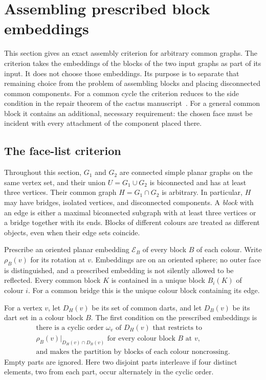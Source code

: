 \section{Assembling prescribed block embeddings}
\label{rep:section}

This section gives an exact assembly criterion for arbitrary common graphs.
The criterion takes the embeddings of the blocks of the two input graphs as
part of its input.  It does not choose those embeddings.  Its purpose is to
separate that remaining choice from the problem of assembling blocks and
placing disconnected common components.  For a common cycle the criterion
reduces to the side condition in the repair theorem of the cactus
manuscript~\cite{cactus}.  For a general common block it contains an additional,
necessary requirement: the chosen face must be incident with every attachment
of the component placed there.

\subsection{The face-list criterion}
\label{rep:criterion}

Throughout this section, $G_1$ and $G_2$ are connected simple planar graphs on
the same vertex set, and their union $U=G_1\cup G_2$ is biconnected and has at
least three vertices.  Their common graph $H=G_1\cap G_2$ is arbitrary.  In
particular, $H$ may have bridges, isolated vertices, and disconnected
components.  A \emph{block} with an edge is either a maximal biconnected
subgraph with at least three vertices or a bridge together with its ends.
Blocks of different colours are treated as different objects, even when their
edge sets coincide.

Prescribe an oriented planar embedding $\mathcal E_B$ of every block $B$ of
each colour.  Write $\rho_B(v)$ for its rotation at $v$.  Embeddings are on an
oriented sphere; no outer face is distinguished, and a prescribed embedding
is not silently allowed to be reflected.  Every common block $K$ is contained
in a unique block $B_i(K)$ of colour $i$.  For a common bridge this is the
unique colour block containing its edge.

For a vertex $v$, let $D_H(v)$ be its set of common darts, and let $D_B(v)$
be its dart set in a colour block $B$.  The first condition
on the prescribed embeddings is
\begin{equation}
\tag{O}\label{rep:eq:order}
\begin{gathered}
\text{there is a cyclic order $\omega_v$ of $D_H(v)$ that restricts to}
\\[-1mm]
\rho_B(v)|_{D_H(v)\cap D_B(v)}\text{ for every colour block $B$ at $v$,}
\\[-1mm]
\text{and makes the partition by blocks of each colour noncrossing.}
\end{gathered}
\end{equation}
Empty parts are ignored.  Here two disjoint parts interleave if four distinct
elements, two from each part, occur alternately in the cyclic order.

